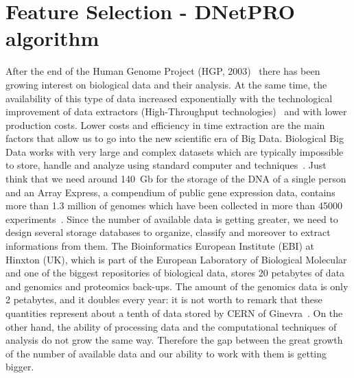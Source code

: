 \documentclass{standalone}
\begin{document}
\chapter[Feature Selection]{Feature Selection - DNetPRO algorithm}\label{chapter1:featsel}



After the end of the Human Genome Project (HGP, 2003)~\cite{McKinney2012} there has been growing interest on biological data and their analysis.
At the same time, the availability of this type of data  increased exponentially with the technological improvement of data extractors (High-Throughput technologies)~\cite{Reuter2015} and with lower production costs.
Lower costs and efficiency in time extraction are the main factors that allow us to go into the new scientific era of Big Data.
Biological Big Data works with very large and complex datasets which are typically impossible to store, handle and analyze using standard computer and techniques~\cite{Kumari2014}.
Just think that we need around 140~Gb for the storage of the DNA of a single person and an Array Express, a compendium of public gene expression data, contains more than 1.3 million of genomes which have been collected in more than 45000 experiments~\cite{Greene2014}.
Since the number of available data is getting greater, we need to design several storage databases to organize, classify and moreover to extract informations from them.
The Bioinformatics European Institute (EBI) at Hinxton (UK), which is part of the European Laboratory of Biological Molecular and one of the biggest repositories of biological data, stores 20 petabytes of data and genomics and proteomics back-ups.
The amount of the genomics data is only 2 petabytes, and it doubles every year: it is not worth to remark that these quantities represent about a tenth of data stored by CERN of Ginevra~\cite{Marx2013}.
On the other hand, the ability of processing data and the computational techniques of analysis do not grow the same way.
Therefore the gap between the great growth of the number of available data and our ability to work with them is getting bigger.
\end{document}
